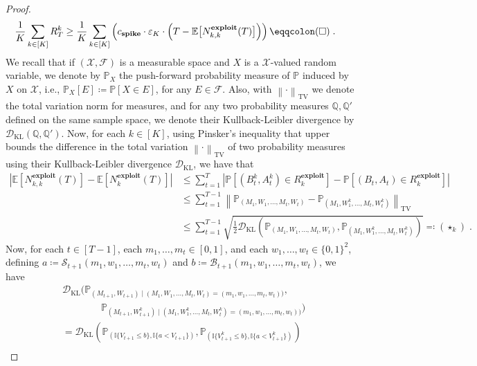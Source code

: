 \documentclass[final,12pt]{colt2025}
\newcommand{\cB}{\mathcal{B}}
\newcommand{\cD}{\mathcal{D}}
\newcommand{\cF}{\mathcal{F}}
\newcommand{\cS}{\mathcal{S}}
\newcommand{\cX}{\mathcal{X}}
\newcommand{\E}{\mathbb{E}}
\newcommand{\Pb}{\mathbb{P}}
\newcommand{\e}{\varepsilon}
\newcommand{\lrb}[1]{\left(#1\right)}
\newcommand{\Brb}[1]{\Bigl(#1\Bigr)}
\newcommand{\bsb}[1]{\bigl[#1\bigr]}
\newcommand{\one}[1]{\mathbb{I}\{#1\}}
\newcommand{\labs}[1]{\left\lvert#1\right\rvert}
\newcommand{\lno}[1]{\left\lVert#1\right\rVert}
\newcommand{\nP}{M}
\newcommand{\np}{m}
\newcommand{\nZ}{V}
\newcommand{\nB}{B}
\newcommand{\ncB}{\cB}
\newcommand{\nb}{b}
\newcommand{\nS}{A}
\newcommand{\ncS}{\cS}
\newcommand{\ns}{a}
\newcommand{\nW}{W}
\newcommand{\nw}{w}
\begin{document}
{\begin{proof}
\begin{align*}
    \frac{1}{K} \sum_{k \in [K]} R^k_T
&\ge
    \frac{1}{K} \sum_{k \in [K]} \lrb{ c_{\textbf{spike}} \cdot \e_K \cdot \Brb{ T - \E \bsb{ N^{\textbf{exploit}}_{k,k}(T) } } }
\eqqcolon
    (\square)\;.
\end{align*}
We recall that if $(\cX,\cF)$ is a measurable space and $X$ is a $\cX$-valued random variable, we denote by $\Pb_X$ the push-forward probability measure of $\Pb$ induced by $X$ on $\cX$, i.e., $\Pb_X [E] \coloneqq \Pb [X \in E] $, for any $E \in \cF$.
Also, with $\lno{\cdot}_{\text{TV}}$ we denote the total variation norm for measures, and for any two probability measures $\mathbb{Q},\mathbb{Q}'$ defined on the same sample space, we denote their Kullback-Leibler divergence by $\cD_{\text{KL}}(\mathbb{Q}, \mathbb{Q}')$. 
Now, for each $k \in [K]$, using Pinsker's inequality \cite[Lemma 2.5]{Tsybakov2008} that upper bounds the difference in the total variation $\lno{\cdot}_{\text{TV}}$ of two probability measures using their Kullback-Leibler divergence $\cD_{\text{KL}}$, we have that 
\begin{align*}
    \labs{\E[N^{\textbf{exploit}}_{k,k}(T)] - \E[N_k^{\textbf{exploit}}(T)]}
&\le
    \sum_{t=1}^T\labs{\Pb[(\nB_t^k,\nS_t^k) \in R^{\textbf{exploit}}_k] - \Pb[(\nB_t,\nS_t) \in R^{\textbf{exploit}}_k]}
\\
&\le
    \sum_{t=1}^{T-1} \lno{ \Pb_{(\nP_1,\nW_1,\dots,\nP_t,\nW_t)} - \Pb_{(\nP_1,\nW_1^k,\dots,\nP_t,\nW_t^k)} }_{\text{TV}}
\\
&\le
    \sum_{t=1}^{T-1} \sqrt{\frac{1}{2} \cD_{\text{KL}}\lrb{\Pb_{(\nP_1,\nW_1,\dots,\nP_t,\nW_t)},\Pb_{(\nP_1,\nW_1^k,\dots,\nP_t,\nW_t^k)}}}
\eqqcolon
    (\star_k)\;.
\end{align*}
Now, for each $t \in [T-1]$, each $\np_1,\dots,\np_t \in [0,1]$, and each $\nw_1,\dots,\nw_t \in \{0,1\}^{2}$, defining $\ns \coloneqq \ncS_{t+1}(\np_1,\nw_1,\dots,\np_t,\nw_t)$ and $\nb \coloneqq \ncB_{t+1}(\np_1,\nw_1,\dots,\np_t,\nw_t)$, we have
\begin{align*}
&
    \cD_{\text{KL}}
    \big(
        \Pb_{(\nP_{t+1},W_{t+1}) \mid (\nP_1,\nW_1,\dots,\nP_{t},W_{t}) = (\np_1,\nw_1,\dots,\np_{t},w_{t}))},
\\ & \qquad\qquad
        \Pb_{(\nP_{t+1},W_{t+1}^k) \mid (\nP_1,\nW_1^k,\dots,\nP_{t},W_{t}^k) = (\np_1,\nw_1,\dots,\np_{t},w_{t}))}
    \big)
\\ &=
    \cD_{\text{KL}}
    \lrb{
        \Pb_{(\one{\nZ_{t+1}\le b}, \one{\ns < \nZ_{t+1}}) },
        \Pb_{(\one{\nZ_{t+1}^k \le b}, \one{\ns < \nZ_{t+1}^k})}
    }
\\ & \qquad

\end{align*}
\end{proof}}
\end{document}
